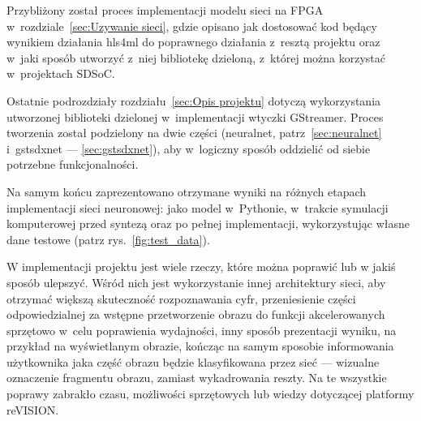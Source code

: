 \documentclass[12pt, oneside, a4paper]{article}
\begin{document}
Przybliżony został proces implementacji modelu sieci na FPGA
w~rozdziale~\ref{sec:Uzywanie sieci}, gdzie opisano jak dostosować kod będący
wynikiem działania hls4ml do poprawnego działania z~resztą projektu
oraz w~jaki sposób utworzyć z~niej bibliotekę dzieloną, z~której można
korzystać w~projektach SDSoC.

Ostatnie podrozdziały rozdziału~\ref{sec:Opis projektu} dotyczą
wykorzystania utworzonej biblioteki dzielonej w~implementacji wtyczki
GStreamer. Proces tworzenia został podzielony na dwie części (neuralnet,
patrz~\ref{sec:neuralnet} i~gstsdxnet --- \ref{sec:gstsdxnet}), aby
w~logiczny sposób oddzielić od siebie potrzebne funkcjonalności.

Na samym końcu zaprezentowano otrzymane wyniki na różnych etapach
implementacji sieci neuronowej: jako model w~Pythonie, w~trakcie symulacji
komputerowej przed syntezą oraz po pełnej implementacji, wykorzystując
własne dane testowe (patrz rys.~\ref{fig:test_data}).

W implementacji projektu jest wiele rzeczy, które można poprawić lub
w jakiś sposób ulepszyć. Wśród nich jest wykorzystanie innej architektury
sieci, aby otrzymać większą skuteczność rozpoznawania cyfr, przeniesienie
części odpowiedzialnej za wstępne przetworzenie obrazu do funkcji
akcelerowanych sprzętowo w~celu poprawienia wydajności, inny sposób
prezentacji wyniku, na przykład na wyświetlanym obrazie, kończąc
na samym sposobie informowania użytkownika jaka część obrazu będzie
klasyfikowana przez sieć --- wizualne oznaczenie fragmentu obrazu, zamiast
wykadrowania reszty. Na te wszystkie poprawy zabrakło czasu, możliwości
sprzętowych lub wiedzy dotyczącej platformy reVISION.

\restoregeometry{}
\end{document}
